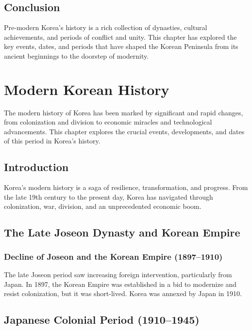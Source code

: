 \documentclass{book}
\begin{document}
\section{Conclusion}
\label{sec:conclusion-pre-modern-korea}
Pre-modern Korea's history is a rich collection of dynasties, cultural achievements, and periods of conflict and unity. This chapter has explored the key events, dates, and periods that have shaped the Korean Peninsula from its ancient beginnings to the doorstep of modernity.

\chapter{Modern Korean History}
\label{ch:modern-korean-history}

The modern history of Korea has been marked by significant and rapid changes, from colonization and division to economic miracles and technological advancements. This chapter explores the crucial events, developments, and dates of this period in Korea’s history.

\section{Introduction}
\label{sec:introduction-modern-korea}
Korea’s modern history is a saga of resilience, transformation, and progress. From the late 19th century to the present day, Korea has navigated through colonization, war, division, and an unprecedented economic boom.

\section{The Late Joseon Dynasty and Korean Empire}
\label{sec:late-joseon-korean-empire}

\subsection{Decline of Joseon and the Korean Empire (1897–1910)}
\label{subsec:decline-joseon-korean-empire}
The late Joseon period saw increasing foreign intervention, particularly from Japan. In 1897, the Korean Empire was established in a bid to modernize and resist colonization, but it was short-lived. Korea was annexed by Japan in 1910.

\section{Japanese Colonial Period (1910–1945)}
\label{sec:japanese-colonial-period}
\end{document}
